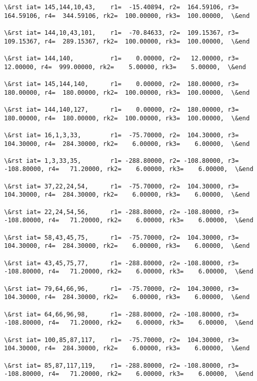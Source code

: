 \documentclass[11pt]{article}
\begin{document}
\begin{Verbatim}[commandchars=\\\{\}]
\&rst iat= 145,144,10,43,    r1=  -15.40894, r2=  164.59106, r3=  164.59106, r4=  344.59106, rk2=  100.00000, rk3=  100.00000,  \&end

\&rst iat= 144,10,43,101,    r1=  -70.84633, r2=  109.15367, r3=  109.15367, r4=  289.15367, rk2=  100.00000, rk3=  100.00000,  \&end

\&rst iat= 144,140,          r1=    0.00000, r2=   12.00000, r3=   12.00000, r4=  999.00000, rk2=    5.00000, rk3=    5.00000,  \&end

\&rst iat= 145,144,140,      r1=    0.00000, r2=  180.00000, r3=  180.00000, r4=  180.00000, rk2=  100.00000, rk3=  100.00000,  \&end

\&rst iat= 144,140,127,      r1=    0.00000, r2=  180.00000, r3=  180.00000, r4=  180.00000, rk2=  100.00000, rk3=  100.00000,  \&end

\&rst iat= 16,1,3,33,        r1=  -75.70000, r2=  104.30000, r3=  104.30000, r4=  284.30000, rk2=    6.00000, rk3=    6.00000,  \&end

\&rst iat= 1,3,33,35,        r1= -288.80000, r2= -108.80000, r3= -108.80000, r4=   71.20000, rk2=    6.00000, rk3=    6.00000,  \&end

\&rst iat= 37,22,24,54,      r1=  -75.70000, r2=  104.30000, r3=  104.30000, r4=  284.30000, rk2=    6.00000, rk3=    6.00000,  \&end

\&rst iat= 22,24,54,56,      r1= -288.80000, r2= -108.80000, r3= -108.80000, r4=   71.20000, rk2=    6.00000, rk3=    6.00000,  \&end

\&rst iat= 58,43,45,75,      r1=  -75.70000, r2=  104.30000, r3=  104.30000, r4=  284.30000, rk2=    6.00000, rk3=    6.00000,  \&end

\&rst iat= 43,45,75,77,      r1= -288.80000, r2= -108.80000, r3= -108.80000, r4=   71.20000, rk2=    6.00000, rk3=    6.00000,  \&end

\&rst iat= 79,64,66,96,      r1=  -75.70000, r2=  104.30000, r3=  104.30000, r4=  284.30000, rk2=    6.00000, rk3=    6.00000,  \&end

\&rst iat= 64,66,96,98,      r1= -288.80000, r2= -108.80000, r3= -108.80000, r4=   71.20000, rk2=    6.00000, rk3=    6.00000,  \&end

\&rst iat= 100,85,87,117,    r1=  -75.70000, r2=  104.30000, r3=  104.30000, r4=  284.30000, rk2=    6.00000, rk3=    6.00000,  \&end

\&rst iat= 85,87,117,119,    r1= -288.80000, r2= -108.80000, r3= -108.80000, r4=   71.20000, rk2=    6.00000, rk3=    6.00000,  \&end


\end{Verbatim}
\end{document}
